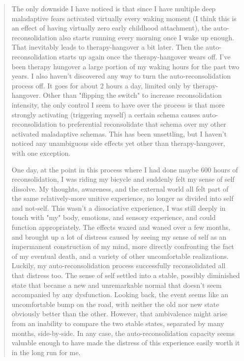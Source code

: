 \documentclass[12pt,letterpaper]{book}
\begin{document}
\begin{quotation}
    The only downside I have noticed is that since I have multiple deep maladaptive fears activated virtually every waking moment (I think this is an effect of having virtually zero early childhood attachment), the auto-reconsolidation also starts running every morning once I wake up enough. That inevitably leads to therapy-hangover a bit later. Then the auto-reconsolidation starts up again once the therapy-hangover wears off. I've been therapy hungover a large portion of my waking hours for the past two years. I also haven't discovered any way to turn the auto-reconsolidation process off. It goes for about 2 hours a day, limited only by therapy-hangover. Other than "flipping the switch" to increase reconsolidation intensity, the only control I seem to have over the process is that more strongly activating (triggering myself) a certain schema causes auto-reconsolidation to preferential reconsolidate that schema over my other activated maladaptive schemas. This has been unsettling, but I haven't noticed any unambiguous side effects yet other than therapy-hangover, with one exception.

    One day, at the point in this process where I had done maybe 600 hours of reconsolidation, I was riding my bicycle and suddenly felt my sense of self dissolve. My thoughts, awareness, and the external world all felt part of the same relatively-more unitive experience, no longer as divided into self and not-self. This wasn't a dissociative experience, I was still deeply in touch with "my" body, emotions, and sensory experience, and could function appropriately. The effects waxed and waned over a few months, and brought up a lot of distress caused by seeing my sense of self as an impermanent construction of my mind, more directly confronting the fact of my eventual death, and a variety of other uncomfortable realizations. Luckily, my auto-reconsolidation process successfully reconsolidated all that distress too. The sense of self settled into a stable, possibly diminished state that became a new and unremarkable normal that doesn't seem accompanied by any dysfunction. Looking back, the event seems like an uncomfortable bump on the road, with neither the old nor new state obviously better than the other. However, that ambivalence might arise from an inability to compare the two stable states, separated by many months, side-by-side. In any case, the auto-reconsolidation capacity seems valuable enough to have made the distress of this experience easily worth it in the long run for me.


\end{quotation}
\end{document}
